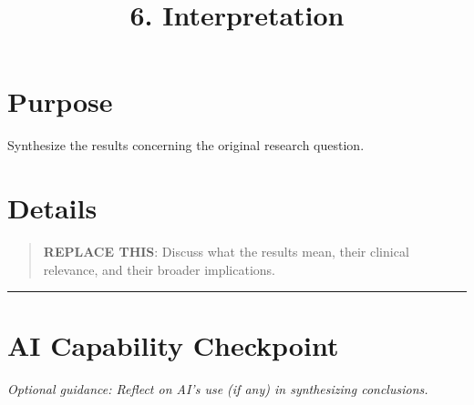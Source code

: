 \documentclass[
]{report}
\title{6. Interpretation}
\author{}
\date{}
\renewcommand*\contentsname{Table of contents}
\newcommand\contentsname{Table of contents}
\begin{document}
\maketitle

\renewcommand*\contentsname{Table of contents}
{
\hypersetup{linkcolor=}
\setcounter{tocdepth}{2}
\tableofcontents
}

\chapter{Purpose}\label{purpose}

Synthesize the results concerning the original research question.

\chapter{Details}\label{details}

\begin{quote}
\textbf{REPLACE THIS}: Discuss what the results mean, their clinical
relevance, and their broader implications.
\end{quote}

\begin{center}\rule{0.5\linewidth}{0.5pt}\end{center}

\chapter{AI Capability Checkpoint}\label{ai-capability-checkpoint}

\emph{Optional guidance: Reflect on AI's use (if any) in synthesizing
conclusions.}
\end{document}
